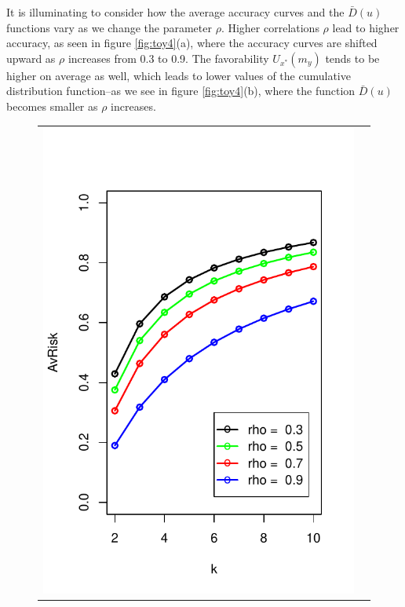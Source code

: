 \documentclass[twoside,11pt]{article}
\begin{document}
It is illuminating to consider how the average accuracy curves and the
$\bar{D}(u)$ functions vary as we change the parameter $\rho$.  Higher
correlations $\rho$ lead to higher accuracy, as seen in
figure \ref{fig:toy4}(a), where the accuracy curves are shifted upward as
$\rho$ increases from 0.3 to 0.9.  The favorability $U_{x^*}(m_y)$
tends to be higher on average as well, which leads to lower values of
the cumulative distribution function--as we see in
figure \ref{fig:toy4}(b), where the function $\bar{D}(u)$ becomes smaller
as $\rho$ increases.



\begin{figure}[h]
\centering
\begin{tabular}{cc}
\includegraphics[scale = 0.45, clip = true, trim = 0.05in 0 0.2in 0.6in]{illus_rhos_avrisk.pdf} &

\end{tabular}
\end{figure}
\end{document}
